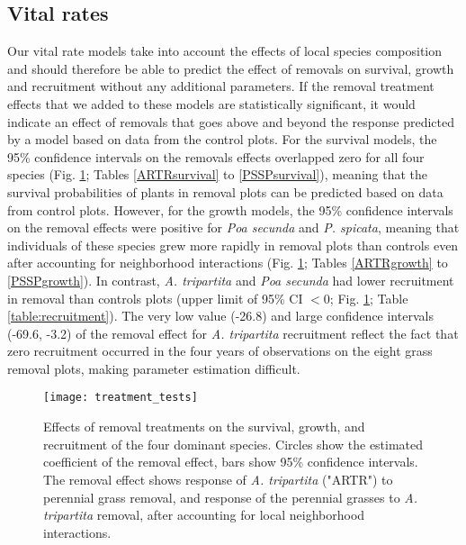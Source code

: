 \documentclass[11pt]{article}
\begin{document}
\begin{doublespacing}
\subsection*{Vital rates}

Our vital rate models take into account the effects of local species composition and should therefore be able to predict the effect of removals on survival, growth and recruitment without any additional parameters. If the removal treatment effects that we added to these models are statistically significant, it would indicate an effect of removals that goes above and beyond the response predicted by a model based on data from the control plots. For the survival models, the 95\% confidence intervals on the removals effects overlapped zero for all four species (Fig. \ref{fig:VitalRateTest}; Tables \ref{ARTRsurvival} to \ref{PSSPsurvival}), meaning that the survival probabilities of plants in removal plots can be predicted based on data from control plots. However, for the growth models, the 95\% confidence intervals on the removal effects were positive for \textit{Poa secunda}  and \textit{P. spicata}, meaning that individuals of these species grew more rapidly in removal plots than controls even after accounting for neighborhood interactions (Fig. \ref{fig:VitalRateTest}; Tables \ref{ARTRgrowth} to \ref{PSSPgrowth}). In contrast, \textit{A. tripartita} and  \textit{Poa secunda} had lower recruitment in removal than controls plots (upper limit of 95\% CI $<0$; Fig. \ref{fig:VitalRateTest}; Table \ref{table:recruitment}). The very low value (-26.8) and large confidence intervals (-69.6, -3.2) of the removal effect for  \textit{A. tripartita} recruitment reflect the fact that zero recruitment occurred in the four years of observations on the eight grass removal plots, making parameter estimation difficult.

 \begin{figure}[tbp]
 \centering
 \texttt{[image: treatment\_tests]}
 \caption{Effects of removal treatments on the survival, growth, and recruitment of the four dominant species. Circles show the estimated coefficient of the removal effect, bars show 95\% confidence intervals. The removal effect shows response of \textit{A. tripartita} ("ARTR") to perennial grass removal, and response of the perennial grasses to \textit{A. tripartita} removal, after accounting for local neighborhood interactions. }
 \label{fig:VitalRateTest}
 \end{figure}


\end{doublespacing}
\end{document}
